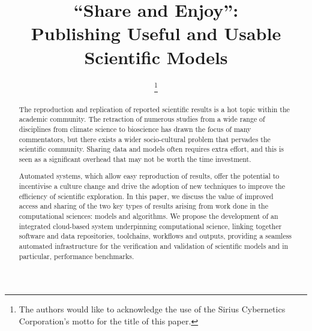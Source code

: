 \documentclass[conference]{IEEEtran}
\begin{document}

\title{``Share and Enjoy'':\\Publishing Useful and Usable Scientific Models}

\author{
%
\thanks{The authors would like to acknowledge the use of the Sirius Cybernetics
  Corporation's motto for the title of this paper. }
\and
{}
}

\maketitle

\begin{abstract}
The reproduction and replication of reported scientific results is a
hot topic within the academic community. The retraction of numerous
studies from a wide range of disciplines from climate science to
bioscience has drawn the focus of many commentators, but there exists
a wider socio-cultural problem that pervades the scientific community.
Sharing data and models often requires extra effort, and this is seen
as a significant overhead that may not be worth the time investment.

Automated systems, which allow easy reproduction of results, offer the
potential to incentivise a culture change and drive the adoption of
new techniques to improve the efficiency of scientific exploration. In
this paper, we discuss the value of improved access and sharing of the
two key types of results arising from work done in the computational
sciences: models and algorithms. We propose the development of an
integrated cloud-based system underpinning computational science,
linking together software and data repositories, toolchains, workflows
and outputs, providing a seamless automated infrastructure for the
verification and validation of scientific models and in particular,
performance benchmarks.
\end{abstract}
\end{document}

